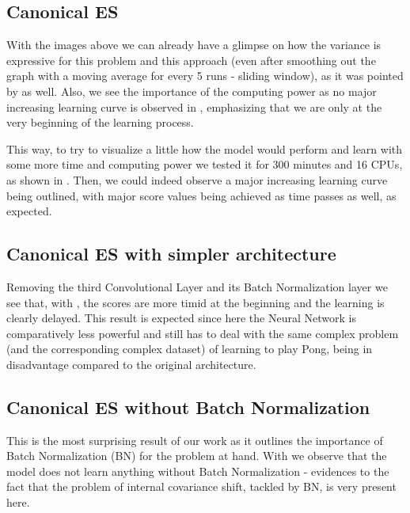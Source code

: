 \documentclass[10pt]{article} %
\begin{document}
\subsection{Canonical ES}
With the images above we can already have a glimpse on how the variance is expressive for this problem and this approach (even after smoothing out the graph with a moving average for every 5 runs - sliding window), as it was pointed by \cite{back-to-basics} as well. Also, we see the importance of the computing power as no major increasing learning curve is observed in , emphasizing that we are only at the very beginning of the learning process.

This way, to try to visualize a little how the model would perform and learn with some more time and computing power we tested it for 300 minutes and 16 CPUs, as shown in . Then, we could indeed observe a major increasing learning curve being outlined, with major score values being achieved as time passes as well, as expected.

\subsection{Canonical ES with simpler architecture}
Removing the third Convolutional Layer and its Batch Normalization layer we see that, with , the scores are more timid at the beginning and the learning is clearly delayed. This result is expected since here the Neural Network is comparatively less powerful and still has to deal with the same complex problem (and the corresponding complex dataset) of learning to play Pong, being in disadvantage compared to the original architecture. 

\subsection{Canonical ES without Batch Normalization}
This is the most surprising result of our work as it outlines the importance of Batch Normalization (BN) for the problem at hand. With  we observe that the model does not learn anything without Batch Normalization - evidences to the fact that the problem of internal covariance shift, tackled by BN, is very present here.
\end{document}
